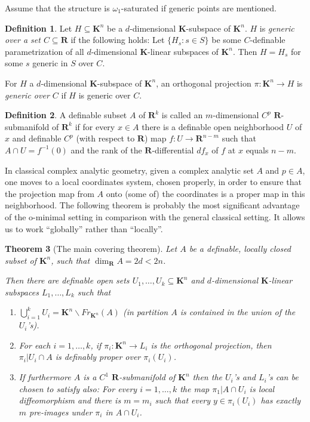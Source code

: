 \documentclass{amsart}
\newtheorem{theorem}{Theorem}[subsection]
\theoremstyle{definition}
\newtheorem{definition}[theorem]{Definition}
\numberwithin{equation}{section}
\begin{document}
Assume that the structure is $\omega_1$-saturated if generic points are mentioned.

\begin{definition}
  Let $H \subseteq \mathbf{K}^n$ be a $d$-dimensional $\mathbf{K}$-subspace of $\mathbf{K}^n$.
  $H$ is \emph{generic over a set $C \subseteq \mathbf{R}$} if the following holds:
  Let $\{H_s: s \in S\}$ be some $C$-definable parametrization of all $d$-dimensional $\mathbf{K}$-linear subspaces of $\mathbf{K}^n$.
  Then $H = H_s$ for some $s$ generic in $S$ over $C$.
\end{definition}

For $H$ a $d$-dimensional $\mathbf{K}$-subspace of $\mathbf{K}^n$,
an orthogonal projection $\pi:\mathbf{K}^n \to H$ is \emph{generic over $C$} if $H$ is generic over $C$.

\begin{definition}
  A definable subset $A$ of $\mathbf{R}^k$ is called an $m$-dimensional $C^p$ $\mathbf{R}$-submanifold of $\mathbf{R}^k$
  if for every $x\in A$ there is a definable open neighborhood $U$ of $x$ and definable $C^p$ (with respect to $\mathbf{R}$) map
  $f: U \to \mathbf{R}^{n-m}$ such that $A \cap U = f^{-1}(0)$ and the rank of the $\mathbf{R}$-differential $df_x$ of $f$ at $x$ equals $n-m$.
\end{definition}

In classical complex analytic geometry,
given a complex analytic set $A$ and $p \in A$,
one moves to a local coordinates system,
chosen properly, in order to ensure that the projection map from $A$ onto (some of) the coordinates is a proper map in this neighborhood.
The following theorem is probably the most significant advantage of the o-minimal setting in comparison with the general classical setting.
It allows us to work “globally” rather than “locally”.

\begin{theorem}[The main covering theorem]
  Let $A$ be a definable, locally closed subset of $\mathbf{K}^n$,
  such that $\dim_{\mathbf{R}}A = 2d < 2n$.

  Then there are definable open sets $U_1,\dots,U_k \subseteq \mathbf{K}^n$ and $d$-dimensional $\mathbf{K}$-linear subspaces $L_1,\dots,L_k$ such that
  \begin{enumerate}[label = {(\arabic*)}]
    \item $\bigcup_{i=1}^k U_i = \mathbf{K}^n\backslash Fr_{\mathbf{K}^n}(A)$ (in partition $A$ is contained in the union of the $U_i$'s).
    \item For each $i = 1,\dots,k$, if $\pi_i:\mathbf{K}^n \to L_i$ is the orthogonal projection, then $\pi_i|U_i\cap A$ is definably proper over $\pi_i(U_i)$.
    \item If furthermore $A$ is a $C^1$ $\mathbf{R}$-submanifold of $\mathbf{K}^n$ then the $U_i$'s and $L_i$'s can be chosen to satisfy also:
    For every $i=1,\dots,k$ the map $\pi_1|A\cap U_i$ is local diffeomorphism and there is $m = m_i$ such that every $y \in \pi_i(U_i)$ has exactly $m$ pre-images under $\pi_i$ in $A \cap U_i$.
  \end{enumerate}
\end{theorem}
\end{document}
